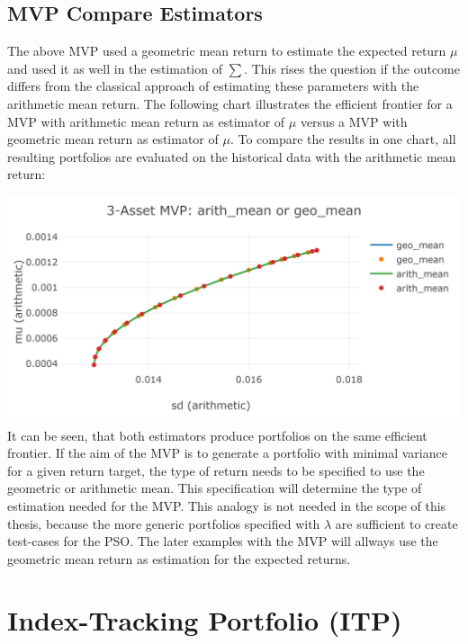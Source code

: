 \documentclass[
  oneside]{book}
\begin{document}
\hypertarget{mvp-compare-estimators}{%
\subsection{MVP Compare Estimators}\label{mvp-compare-estimators}}

The above MVP used a geometric mean return to estimate the expected return \(\mu\) and used it as well in the estimation of \(\textstyle\sum\). This rises the question if the outcome differs from the classical approach of estimating these parameters with the arithmetic mean return. The following chart illustrates the efficient frontier for a MVP with arithmetic mean return as estimator of \(\mu\) versus a MVP with geometric mean return as estimator of \(\mu\). To compare the results in one chart, all resulting portfolios are evaluated on the historical data with the arithmetic mean return:

\includegraphics{Master_Thesis_files/figure-latex/unnamed-chunk-4-1.png}
It can be seen, that both estimators produce portfolios on the same efficient frontier. If the aim of the MVP is to generate a portfolio with minimal variance for a given return target, the type of return needs to be specified to use the geometric or arithmetic mean. This specification will determine the type of estimation needed for the MVP. This analogy is not needed in the scope of this thesis, because the more generic portfolios specified with \(\lambda\) are sufficient to create test-cases for the PSO. The later examples with the MVP will allways use the geometric mean return as estimation for the expected returns.

\hypertarget{index-tracking-portfolio-itp}{%
\section{Index-Tracking Portfolio (ITP)}\label{index-tracking-portfolio-itp}}
\end{document}

